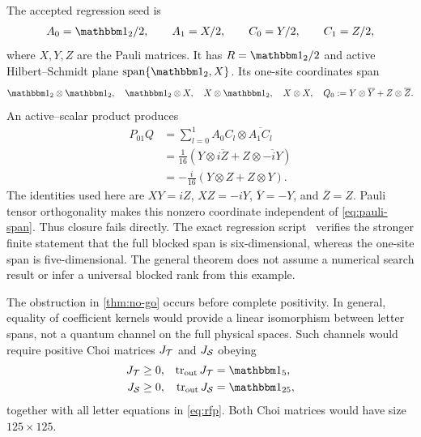 The accepted regression seed is
\begin{align}
	A_0=\Id_2/2,\qquad A_1=X/2,\qquad
	C_0=Y/2,\qquad C_1=Z/2,
	\label{eq:pauli}
\end{align}
where $X,Y,Z$ are the Pauli matrices.
It has $R=\Id_2/2$ and active Hilbert--Schmidt plane
$\operatorname{span}\{\Id_2,X\}$.
Its one-site coordinates span
\begin{align}
	\Id_2\otimes\Id_2,\quad
	\Id_2\otimes X,\quad
	X\otimes\Id_2,\quad
	X\otimes X,\quad
	Q_0:=Y\otimes\overline Y+Z\otimes\overline Z.
	\label{eq:pauli-span}
\end{align}
An active--scalar product produces
\begin{align}
	P_{01}Q
	 & =\sum_{l=0}^1A_0C_l\otimes\overline{A_1C_l}
	\nonumber                                      \\
	 & =\frac1{16}\left(Y\otimes\overline{iZ}
	+Z\otimes\overline{-iY}\right)
	\nonumber                                      \\
	 & =-\frac{i}{16}(Y\otimes Z+Z\otimes Y).
	\label{eq:pauli-product}
\end{align}
The identities used here are $XY=iZ$, $XZ=-iY$,
$\overline Y=-Y$, and $\overline Z=Z$.
Pauli tensor orthogonality makes this nonzero coordinate independent
of \cref{eq:pauli-span}. Thus closure fails directly.
The exact regression script~\cite{Checks} verifies the stronger
finite statement that the full blocked span is six-dimensional,
whereas the one-site span is five-dimensional.
The general theorem does not assume a numerical search result or
infer a universal blocked rank from this example.

The obstruction in \cref{thm:no-go} occurs before complete positivity.
In general, equality of coefficient kernels would provide a linear
isomorphism between letter spans, not a quantum channel on the full
physical spaces. Such channels would require positive Choi matrices
$J_{\mathcal{T}}$ and $J_{\mathcal{S}}$ obeying
\begin{align}
	J_{\mc T}                   & \geq0,
	                            &
	\tr_{\mathrm{out}}J_{\mc T} & =\Id_5,
	\nonumber                                \\
	J_{\mc S}                   & \geq0,
	                            &
	\tr_{\mathrm{out}}J_{\mc S} & =\Id_{25},
	\label{eq:channel-constraints}
\end{align}
together with all letter equations in \cref{eq:rfp}.
Both Choi matrices would have size $125\times125$.


